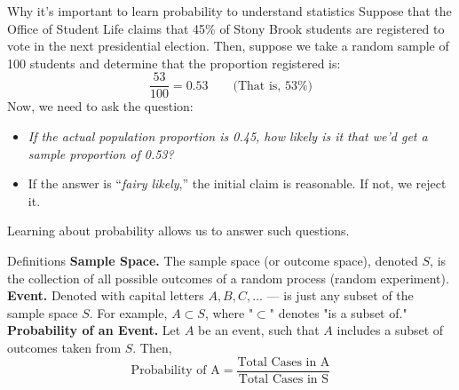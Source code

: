 \documentclass[handout]{beamer} %
\begin{document}

\begin{frame}{Why it’s important to learn probability to understand statistics}
    Suppose that the Office of Student Life claims that 45\% of Stony Brook students are registered to vote in the next presidential election. \pause Then, suppose we take a random sample of 100 students and determine that the proportion registered is:
    \[
    \frac{53}{100} = 0.53 \quad \quad  \text{(That is, 53\%)}
    \] \pause
    Now, we need to ask the question: \
    \begin{itemize}
        \item \emph{If the actual population proportion is 0.45, how likely is it that we’d get a sample proportion of 0.53?} \pause 
        \item If the answer is “\emph{fairy likely},” the initial claim is reasonable. If not, we reject it.  \pause 
    \end{itemize}
    Learning about probability allows us to answer such questions.
\end{frame}

\begin{frame}{Definitions}
    \textbf{Sample Space.} The sample space (or outcome space), denoted $S$, is the collection of all possible outcomes of a random process (random experiment). \\ \pause
    \textbf{Event.} Denoted with capital letters $A, B, C, \ldots$ — is just any subset of the sample space $S$. For example, $A \subset S$, where "$\subset$" denotes "is a subset of." \\ \pause
    \textbf{Probability of an Event.} Let $A$ be an event, such that $A$ includes a subset of outcomes taken from $S$. Then, \\ \pause
    \[
    \text{Probability of A} = \frac{\text{Total Cases in A}}{\text{Total Cases in S}}
    \]
\end{frame}
\end{document}
